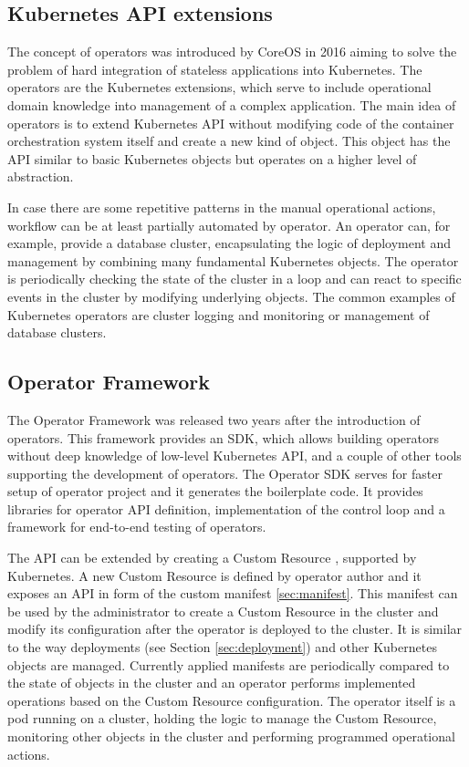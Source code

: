 \documentclass[
  digital, %
  twoside, %
  table,   %
  nolof,   %
  nolot,   %
]{fithesis3}
\begin{document}
\subsection{Kubernetes API extensions}
The concept of operators \cite{kubernetes-operator} was introduced by CoreOS \cite{operators} in 2016 aiming to solve the problem of hard integration of stateless applications into Kubernetes. The operators are the Kubernetes extensions, which serve to include operational domain knowledge into management of a complex application. The main idea of operators is to extend Kubernetes API without modifying code of the container orchestration system itself and create a new kind of object. This object has the API similar to basic Kubernetes objects but operates on a higher level of abstraction.

In case there are some repetitive patterns in the manual operational actions, workflow can be at least partially automated by operator. An operator can, for example, provide a database cluster, encapsulating the logic of deployment and management by combining many fundamental Kubernetes objects. The operator is periodically checking the state of the cluster in a loop and can react to specific events in the cluster by modifying underlying objects. The common examples of Kubernetes operators are cluster logging and monitoring or management of database clusters.

\subsection{Operator Framework} \label{sec:operator_framework}
The Operator Framework \cite{operator-framework} was released two years after the introduction of operators. This framework provides an SDK, which allows building operators without deep knowledge of low-level Kubernetes API, and a couple of other tools supporting the development of operators. The Operator SDK serves for faster setup of operator project and it generates the boilerplate code. It provides libraries for operator API definition, implementation of the control loop and a framework for end-to-end testing of operators.

The API can be extended by creating a Custom Resource \cite{custom-resources}, supported by Kubernetes. A new Custom Resource is defined by operator author and it exposes an API in form of the custom manifest \ref{sec:manifest}. This manifest can be used by the administrator to create a Custom Resource in the cluster and modify its configuration after the operator is deployed to the cluster. It is similar to the way deployments (see Section \ref{sec:deployment}) and other Kubernetes objects are managed. Currently applied manifests are periodically compared to the state of objects in the cluster and an operator performs implemented operations based on the Custom Resource configuration. The operator itself is a pod running on a cluster, holding the logic to manage the Custom Resource, monitoring other objects in the cluster and performing programmed operational actions.
\end{document}
